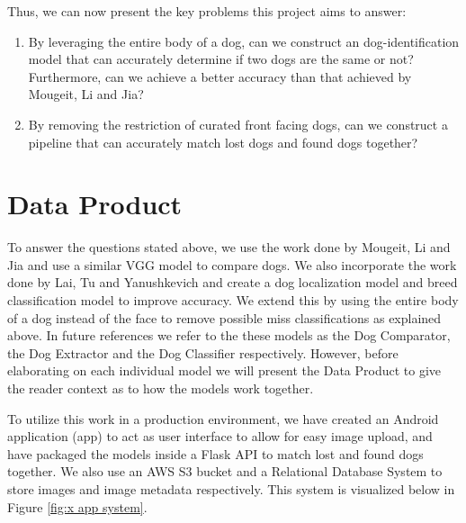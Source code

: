 \documentclass{article}
\begin{document}
Thus, we can now present the key problems this project aims to answer:

\begin{enumerate}
  \item By leveraging the entire body of a dog, can we construct an dog-identification model that can accurately determine if two dogs are the same or not?  Furthermore, can we achieve a better accuracy than that achieved by Mougeit, Li and Jia?
  \item By removing the restriction of curated front facing dogs, can we construct a pipeline that can accurately match lost dogs and found dogs together? 
\end{enumerate}

\section{Data Product}

	To answer the questions stated above, we use the work done by Mougeit, Li and Jia and use a similar VGG model to compare dogs.  We also incorporate the work done by Lai, Tu and Yanushkevich and create a dog localization model and breed classification model to improve accuracy.   We extend this by using the entire body of a dog instead of the face to remove possible miss classifications as explained above.  In future references we refer to the these models as the Dog Comparator, the Dog Extractor and the Dog Classifier respectively.  However, before elaborating on each individual model we will present the Data Product to give the reader context as to how the models work together.

	To utilize this work in a production environment, we have created an Android application (app) to act as user interface to allow for easy image upload, and have packaged the models inside a Flask API to match lost and found dogs together. We also use an AWS S3 bucket and a Relational Database System to store images and image metadata respectively.  This system is visualized below in Figure \ref{fig:x app system}.
\end{document}
